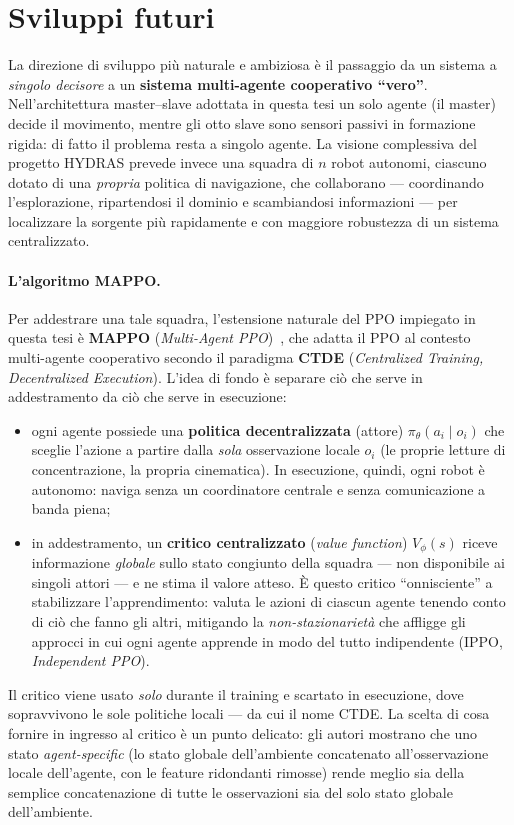 \section{Sviluppi futuri}

La direzione di sviluppo pi\`u naturale e ambiziosa \`e il passaggio da un sistema a
\emph{singolo decisore} a un \textbf{sistema multi-agente cooperativo ``vero''}.
Nell'architettura master--slave adottata in questa tesi un solo agente (il master) decide
il movimento, mentre gli otto slave sono sensori passivi in formazione rigida: di fatto il
problema resta a singolo agente. La visione complessiva del progetto HYDRAS prevede invece
una squadra di $n$ robot autonomi, ciascuno dotato di una \emph{propria} politica di
navigazione, che collaborano --- coordinando l'esplorazione, ripartendosi il dominio e
scambiandosi informazioni --- per localizzare la sorgente pi\`u rapidamente e con maggiore
robustezza di un sistema centralizzato.

\paragraph{L'algoritmo MAPPO.} Per addestrare una tale squadra, l'estensione naturale del
PPO impiegato in questa tesi \`e \textbf{MAPPO} (\emph{Multi-Agent PPO})~\citep{mappo}, che
adatta il PPO al contesto multi-agente cooperativo secondo il paradigma \textbf{CTDE}
(\emph{Centralized Training, Decentralized Execution}). L'idea di fondo \`e separare ci\`o
che serve in addestramento da ci\`o che serve in esecuzione:
\begin{itemize}[leftmargin=1.4em, itemsep=3pt]
    \item ogni agente possiede una \textbf{politica decentralizzata} (attore)
          $\pi_\theta(a_i \mid o_i)$ che sceglie l'azione a partire dalla \emph{sola}
          osservazione locale $o_i$ (le proprie letture di concentrazione, la propria
          cinematica). In esecuzione, quindi, ogni robot \`e autonomo: naviga senza un
          coordinatore centrale e senza comunicazione a banda piena;
    \item in addestramento, un \textbf{critico centralizzato} (\emph{value function})
          $V_\phi(s)$ riceve informazione \emph{globale} sullo stato congiunto della
          squadra --- non disponibile ai singoli attori --- e ne stima il valore atteso.
          \`E questo critico ``onnisciente'' a stabilizzare l'apprendimento: valuta le
          azioni di ciascun agente tenendo conto di ci\`o che fanno gli altri, mitigando la
          \emph{non-stazionariet\`a} che affligge gli approcci in cui ogni agente apprende
          in modo del tutto indipendente (IPPO, \emph{Independent PPO}).
\end{itemize}
Il critico viene usato \emph{solo} durante il training e scartato in esecuzione, dove
sopravvivono le sole politiche locali --- da cui il nome CTDE. La scelta di cosa fornire in
ingresso al critico \`e un punto delicato: gli autori mostrano che uno stato
\emph{agent-specific} (lo stato globale dell'ambiente concatenato all'osservazione locale
dell'agente, con le feature ridondanti rimosse) rende meglio sia della semplice
concatenazione di tutte le osservazioni sia del solo stato globale dell'ambiente.

